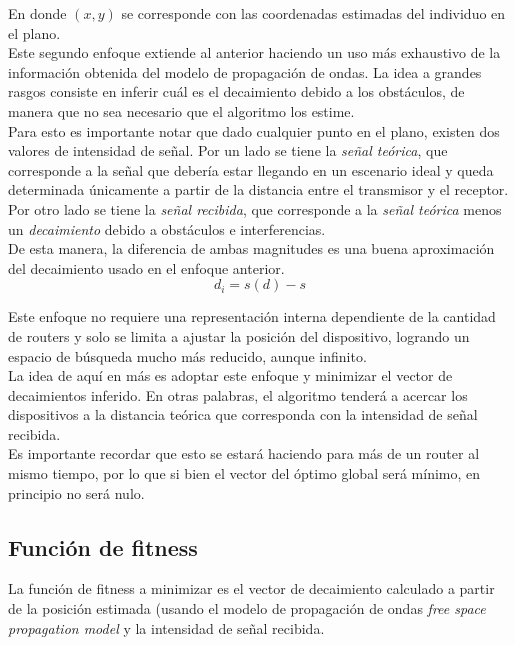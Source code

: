\documentclass[journal]{IEEEtran}
\begin{document}
En donde $(x,y)$ se corresponde con las coordenadas estimadas del individuo en el plano.\\

Este segundo enfoque extiende al anterior haciendo un uso más exhaustivo de la información obtenida del modelo de propagación de ondas. La idea a grandes rasgos consiste en inferir cuál es el decaimiento debido a los obstáculos, de manera que no sea necesario que el algoritmo los estime.\\

Para esto es importante notar que dado cualquier punto en el plano, existen dos valores de intensidad de señal. Por un lado se tiene la \emph{señal teórica}, que corresponde a la señal que debería estar llegando en un escenario ideal y queda determinada únicamente a partir de la distancia entre el transmisor y el receptor. Por otro lado se tiene la \emph{señal recibida}, que corresponde a la \emph{señal teórica} menos un \emph{decaimiento} debido a obstáculos e interferencias.\\

De esta manera, la diferencia de ambas magnitudes es una buena aproximación del decaimiento usado en el enfoque anterior.\\

$$d_i = s(d) - s$$

Este enfoque no requiere una representación interna dependiente de la cantidad de routers y solo se limita a ajustar la posición del dispositivo, logrando un espacio de búsqueda mucho más reducido, aunque infinito.\\

La idea de aquí en más es adoptar este enfoque y minimizar el vector de decaimientos inferido. En otras palabras, el algoritmo tenderá a acercar los dispositivos a la distancia teórica que corresponda con la intensidad de señal recibida.\\

Es importante recordar que esto se estará haciendo para más de un router al mismo tiempo, por lo que si bien el vector del óptimo global será mínimo, en principio no será nulo.\\

\subsection{Función de fitness}

La función de fitness a minimizar es el vector de decaimiento calculado a partir de la posición estimada (usando el modelo de propagación de ondas \emph{free space propagation model} y la intensidad de señal recibida.\\
\end{document}
